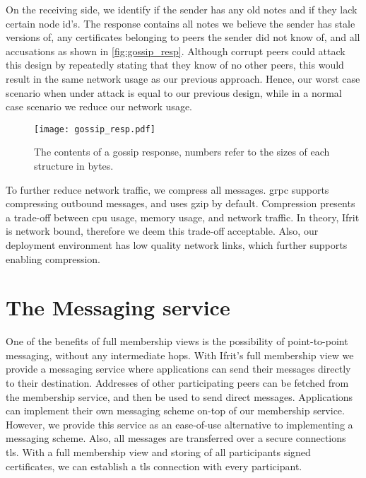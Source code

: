 \documentclass[USenglish]{uit-thesis}
\begin{document}
On the receiving side, we identify if the sender has any old notes and if they lack certain node id's.
The response contains all notes we believe the sender has stale versions of, any certificates belonging to peers the sender did not know of, and all accusations as shown in \autoref{fig:gossip_resp}.
Although corrupt peers could attack this design by repeatedly stating that they know of no other peers, this would result in the same network usage as our previous approach.
Hence, our worst case scenario when under attack is equal to our previous design, while in a normal case scenario we reduce our network usage.
 
\begin{figure}[h]
	\centering
	\texttt{[image: gossip\_resp.pdf]}
	\caption{The contents of a gossip response, numbers refer to the sizes of each structure in bytes.}
	\label{fig:gossip_resp}
\end{figure}

To further reduce network traffic, we compress all messages.
\gls{grpc} supports compressing outbound messages, and uses \gls{gzip} by default.
Compression presents a trade-off between \gls{cpu} usage, memory usage, and network traffic.
In theory, Ifrit is network bound, therefore we deem this trade-off acceptable.
Also, our deployment environment has low quality network links, which further supports enabling compression. 




\section{The Messaging service}
One of the benefits of full membership views is the possibility of point-to-point messaging, without any intermediate hops.
With Ifrit's full membership view we provide a messaging service where applications can send their messages directly to their destination.
Addresses of other participating peers can be fetched from the membership service, and then be used to send direct messages.
Applications can implement their own messaging scheme on-top of our membership service.
However, we provide this service as an ease-of-use alternative to implementing a messaging scheme.
Also, all messages are transferred over a secure connections \gls{tls}. 
With a full membership view and storing of all participants signed certificates, we can establish a \gls{tls} connection with every participant.
\end{document}
